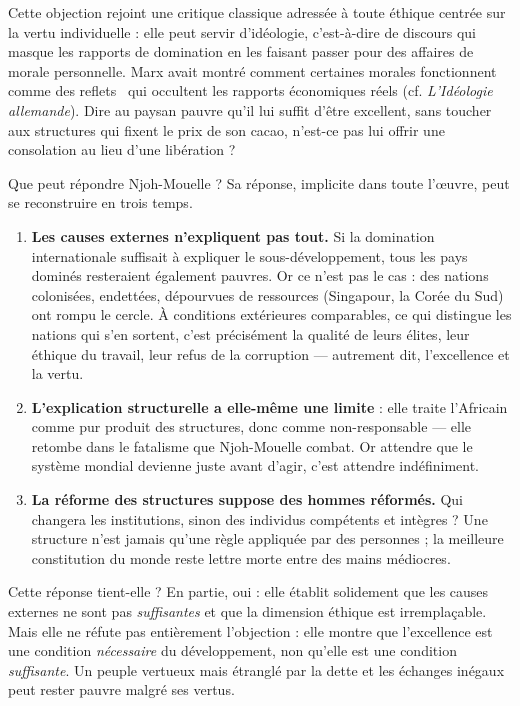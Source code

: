 \documentclass[11pt]{article}
\newcommand{\cle}[1]{{\popxbold\color{popdark}#1}}
\newcounter{popsec}
\newcounter{popsub}
\newcommand{\courssub}[1]{%
  \stepcounter{popsub}%
  \par\vspace{9pt}\noindent{\popxbold\fontsize{11.5}{13}\selectfont\color{popink}{\color{poporange}\thepopsec.\thepopsub}\hspace{6pt}#1}\par\nopagebreak\vspace{4pt}
}
\begin{document}
Cette objection rejoint une critique classique adressée à toute éthique centrée sur la vertu individuelle : elle peut servir d'\cle{idéologie}, c'est-à-dire de discours qui masque les rapports de domination en les faisant passer pour des affaires de morale personnelle. Marx avait montré comment certaines morales fonctionnent comme des \guillemotleft reflets \guillemotright\ qui occultent les rapports économiques réels (cf. \emph{L'Idéologie allemande}). Dire au paysan pauvre qu'il lui suffit d'être excellent, sans toucher aux structures qui fixent le prix de son cacao, n'est-ce pas lui offrir une consolation au lieu d'une libération ?

\courssub{La réponse de Njoh-Mouelle et son évaluation}

Que peut répondre Njoh-Mouelle ? Sa réponse, implicite dans toute l'œuvre, peut se reconstruire en trois temps.

\begin{enumerate}
\item \textbf{Les causes externes n'expliquent pas tout.} Si la domination internationale suffisait à expliquer le sous-développement, tous les pays dominés resteraient également pauvres. Or ce n'est pas le cas : des nations colonisées, endettées, dépourvues de ressources (Singapour, la Corée du Sud) ont rompu le cercle. À \cle{conditions extérieures comparables}, ce qui distingue les nations qui s'en sortent, c'est précisément la qualité de leurs élites, leur éthique du travail, leur refus de la corruption — autrement dit, l'excellence et la vertu.
\item \textbf{L'explication structurelle a elle-même une limite} : elle traite l'Africain comme pur produit des structures, donc comme non-responsable — elle retombe dans le fatalisme que Njoh-Mouelle combat. Or attendre que le système mondial devienne juste avant d'agir, c'est attendre indéfiniment.
\item \textbf{La réforme des structures suppose des hommes réformés.} Qui changera les institutions, sinon des individus compétents et intègres ? Une structure n'est jamais qu'une règle appliquée par des personnes ; la meilleure constitution du monde reste lettre morte entre des mains médiocres.
\end{enumerate}

Cette réponse tient-elle ? En partie, oui : elle établit solidement que les causes externes ne sont pas \emph{suffisantes} et que la dimension éthique est irremplaçable. Mais elle ne réfute pas entièrement l'objection : elle montre que l'excellence est une condition \emph{nécessaire} du développement, non qu'elle est une condition \emph{suffisante}. Un peuple vertueux mais étranglé par la dette et les échanges inégaux peut rester pauvre malgré ses vertus.
\end{document}

